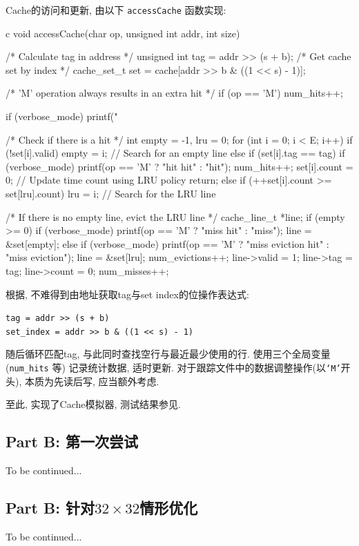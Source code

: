 Cache的访问和更新, 由以下 \verb|accessCache| 函数实现:
\begin{code}{c}
void accessCache(char op, unsigned int addr, int size) {

  /* Calculate tag in address */
  unsigned int tag = addr >> (s + b);
  /* Get cache set by index */
  cache_set_t set = cache[addr >> b & ((1 << s) - 1)];

  /* 'M' operation always results in an extra hit */
  if (op == 'M')
    num_hits++;

  if (verbose_mode)
    printf("%

  /* Check if there is a hit */
  int empty = -1, lru = 0;
  for (int i = 0; i < E; i++) {
    if (!set[i].valid)
      empty = i; // Search for an empty line
    else if (set[i].tag == tag) {
      if (verbose_mode)
        printf(op == 'M' ? "hit hit\n" : "hit\n");
      num_hits++;
      set[i].count = 0; // Update time count using LRU policy
      return;
    } else if (++set[i].count >= set[lru].count)
      lru = i; // Search for the LRU line
  }

  /* If there is no empty line, evict the LRU line */
  cache_line_t *line;
  if (empty >= 0) {
    if (verbose_mode)
      printf(op == 'M' ? "miss hit\n" : "miss\n");
    line = &set[empty];
  } else {
    if (verbose_mode)
      printf(op == 'M' ? "miss eviction hit\n" : "miss eviction\n");
    line = &set[lru];
    num_evictions++;
  }
  line->valid = 1;
  line->tag = tag;
  line->count = 0;
  num_misses++;
}
\end{code}

根据, 不难得到由地址获取tag与set index的位操作表达式:
\begin{center}
  \verb|tag = addr >> (s + b)| \\
  \verb|set_index = addr >> b & ((1 << s) - 1)|
\end{center}

随后循环匹配tag, 与此同时查找空行与最近最少使用的行. 使用三个全局变量 (\verb|num_hits| 等) 记录统计数据, 适时更新. 对于跟踪文件中的数据调整操作(以\verb|‘M’|开头), 本质为先读后写, 应当额外考虑.

至此, 实现了Cache模拟器, 测试结果参见.

\subsection{Part B: 第一次尝试}
To be continued...

\subsection[Part B: 针对32 x 32情形优化]{Part B: 针对$32 \times 32$情形优化}
To be continued...

